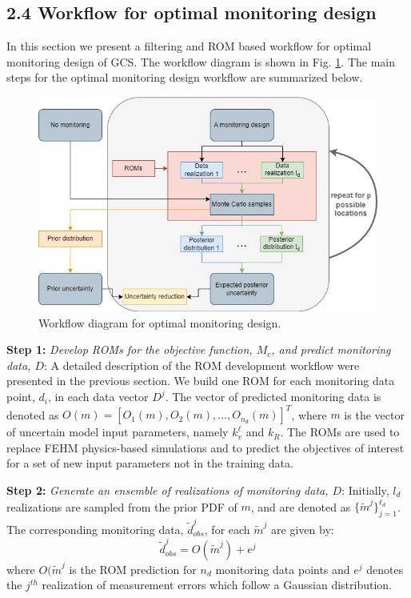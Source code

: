 \documentclass[10pt, twoside]{article}
\begin{document}
\subsection*{2.4 Workflow for optimal monitoring design}
In this section we present a filtering and ROM based workflow for optimal monitoring design of GCS. The workflow diagram is shown in Fig. \ref{opt_workflow}. The main steps for the optimal monitoring design workflow are summarized below.

\begin{figure} [H]
\centering
\includegraphics[width=14 cm]{Figure 4.jpg}
\caption{Workflow diagram for optimal monitoring design.}
\label{opt_workflow}
\end{figure}

\textbf{Step 1:} \textit{Develop ROMs for the objective function, $M_c$, and predict monitoring data, $D$}: A detailed description of the ROM development workflow were presented in the previous section. We build one ROM for each monitoring data point, $d_i$, in each data vector $D^j$. The vector of predicted monitoring data is denoted as $O(m)=[O_1(m), O_2(m), \ldots,O_{n_d}(m)]^T$, where $m$ is the vector of uncertain model input parameters, namely $k_v^\ell$ and $k_R$. The ROMs are used to replace FEHM physics-based simulations and to predict the objectives of interest for a set of new input parameters not in the training data.

\textbf{Step 2:} \textit{Generate an ensemble of realizations of monitoring data, $D$}: Initially, $l_d$ realizations are sampled from the prior PDF of $m$, and are denoted as $ \{\widetilde{m}^j\}_{j=1}^{\ell_d}$. The corresponding monitoring data, $\widetilde{d}_{obs}^j$, for each $\widetilde{m}^j$ are given by:
\begin{equation} \label{eq:4}
    \widetilde{d}_{obs}^j = O(\widetilde{m}^j) + e^j
\end{equation}
where $O(\widetilde{m}^j$ is the ROM prediction for $n_d$ monitoring data points and $e^j$ denotes the $j^{th}$ realization of measurement errors which follow a Gaussian distribution.
\end{document}
